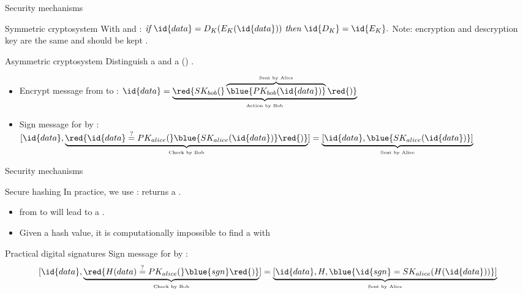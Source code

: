 \begin{frame}{Security mechanisms}
  \begin{block}{Symmetric cryptosystem}
    With  and :
    \(
    \mbox{\itshape if\ } \id{data} = D_K(E_K(\id{data})) \mbox{\itshape \ then\ } \id{D_K} = \id{E_K}.
    \)
    Note: encryption and descryption key are the same and should be kept .
  \end{block}
  \begin{block}{Asymmetric cryptosystem}
    Distinguish a   and a  ()
     .
    \begin{itemize}\tightlist
      \item Encrypt message from  to :
            \(
            \id{data} =
            \underbrace{%
              \red{SK_{bob}(}\overbrace{%
                \blue{PK_{bob}(\id{data})}
              }^{\mbox{\tiny Sent by Alice}}\red{)}
            }_{\mbox{\tiny Action by Bob}}
            \)
      \item Sign message for  by :
            \(
            [\id{data}, \underbrace{%
            \red{\id{data}\stackrel{?}{=}PK_{alice}(}\blue{SK_{alice}(\id{data})}\red{)}
            }_{\mbox{\tiny Check by Bob}}
            ] =
            \underbrace{%
              [\id{data}, \blue{SK_{alice}(\id{data})}]
            }_{\mbox{\tiny Sent by Alice}}
            \)
    \end{itemize}
  \end{block}
\end{frame}
\begin{frame}{Security mechanisms}
  \begin{block}{Secure hashing}
    In practice, we use :  returns a . \vspace*{-6pt}
    \begin{itemize}\tightlist
      \item {} from  to  will lead to a 
            .
      \item Given a hash value, it is computationally impossible to find a  with 
    \end{itemize}
  \end{block}
  \onslide
  \begin{block}{Practical digital signatures}
    Sign message for  by :
    \[
      [\id{data}, \underbrace{%
      \red{H(data)\stackrel{?}{=}PK_{alice}(}\blue{sgn}\red{)}
      }_{\mbox{\tiny Check by Bob}}
      ] =
      \underbrace{%
        [\id{data}, H, \blue{\id{sgn} = SK_{alice}(H(\id{data}))}]
      }_{\mbox{\tiny Sent by Alice}}
    \]
  \end{block}
\end{frame}

